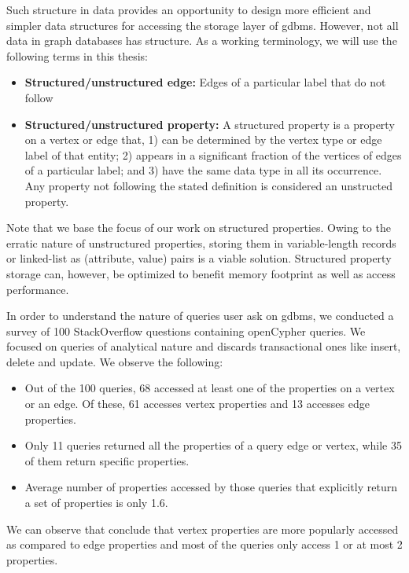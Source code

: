 \begin{guideline}
\begin{enumerate}
\end{enumerate}

Such structure in data provides an opportunity to design more efficient and simpler data structures for accessing the storage layer of \gls{gdbms}. However, not all data in graph databases has structure. As a working terminology, we will use the following terms in this thesis:

\begin{itemize}
	\item \textbf{Structured/unstructured edge:} Edges of a particular label that do not follow 
	\item \textbf{Structured/unstructured property:} A structured property is a property on a vertex or edge that, 1) can be determined by the vertex type or edge label of that entity; 2) appears in a significant fraction of the vertices of edges of a particular label; and 3) have the same data type in all its occurrence. Any property not following the stated definition is considered an unstructed property.
	
\end{itemize}

Note that we base the focus of our work on structured properties. Owing to the erratic nature of unstructured properties, storing them in variable-length records or linked-list as (attribute, value) pairs is a viable solution. Structured property storage can, however, be optimized to benefit memory footprint as well as access performance.

\end{guideline}

\begin{guideline}
In order to understand the nature of queries user ask on \gls{gdbms}, we conducted a survey of 100 StackOverflow questions containing openCypher queries. We focused on queries of analytical nature and discards transactional ones like insert, delete and update. We observe the following: 

\begin{itemize}
	
	\item Out of the 100 queries, 68 accessed at least one of the properties on a vertex or an edge. Of these, 61 accesses vertex properties and 13 accesses edge properties.
	
	\item Only 11 queries returned all the properties of a query edge or vertex, while 35 of them return specific properties.
	
	\item Average number of properties accessed by those queries that explicitly return a set of properties is only 1.6.
	
\end{itemize}

We can observe that conclude that vertex properties are more popularly accessed as compared to edge properties and most of the queries only access 1 or at most 2 properties.

\end{guideline}
